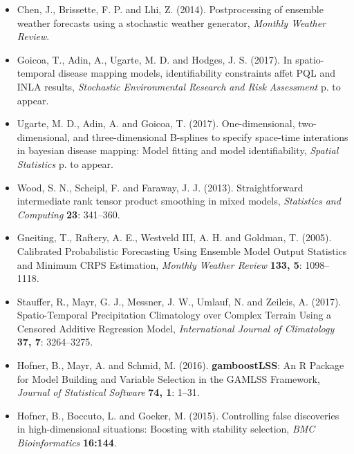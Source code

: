 \documentclass[american,foldmarks=false,noconfig]{uibklttr}
\begin{document}
\begin{itemize}[leftmargin=*]

\item[] Chen, J., Brissette, F. P. and Lhi, Z. (2014). Postprocessing 
of ensemble weather forecasts using a stochastic weather generator, 
\textit{Monthly Weather Review}.

\item[] Goicoa, T., Adin, A., Ugarte, M. D. and Hodges, J. S. (2017). 
In spatio-temporal disease mapping models, identifiability constraints 
affet PQL and INLA results, \textit{Stochastic Environmental Research 
and Risk Assessment} p. to appear.

\item[] Ugarte, M. D., Adin, A. and Goicoa, T. (2017). One-dimensional, 
two-dimensional, and three-dimensional B-splines to specify space-time 
interations in bayesian disease mapping: Model fitting and model 
identifiability, \textit{Spatial Statistics} p. to appear.

\item[] Wood, S. N., Scheipl, F. and Faraway, J. J. (2013). 
Straightforward intermediate rank tensor product smoothing in mixed models, 
\textit{Statistics and Computing} \textbf{23}: 341--360.

\item[] Gneiting, T., Raftery, A. E., Westveld III, A. H. and Goldman, T. (2005). 
Calibrated Probabilistic Forecasting Using Ensemble Model Output Statistics and 
Minimum CRPS Estimation,
\textit{Monthly Weather Review} \textbf{133, 5}: 1098--1118.

\item[] Stauffer, R., Mayr, G. J., Messner, J. W., Umlauf, N. and Zeileis, A. (2017). 
Spatio-Temporal Precipitation Climatology over Complex Terrain Using a Censored Additive Regression Model,
\textit{International Journal of Climatology} \textbf{37, 7}: 3264--3275.

\item[] Hofner, B., Mayr, A. and Schmid, M. (2016). 
\textbf{gamboostLSS}: An \textsf{R} Package for Model Building and 
Variable Selection in the {GAMLSS} Framework,
\textit{Journal of Statistical Software} \textbf{74, 1}: 1--31.

\item[] Hofner, B., Boccuto, L. and Goeker, M. (2015). 
Controlling false discoveries in high-dimensional situations: Boosting 
with stability selection,
\textit{BMC Bioinformatics} \textbf{16:144}.


\end{itemize}
\end{document}
